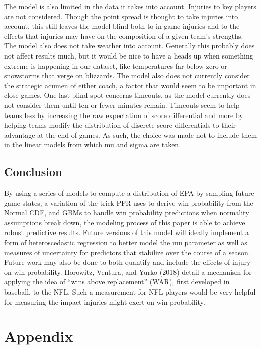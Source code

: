 \documentclass[12pt,twoside]{dukestatscithesis}
\begin{document}
The model is also limited in the data it takes into account. Injuries to key players are not considered. Though the point spread is thought to take injuries into account, this still leaves the model blind both to in-game injuries and to the effects that injuries may have on the composition of a given team's strengths. The model also does not take weather into account. Generally this probably does not affect results much, but it would be nice to have a heads up when something extreme is happening in our dataset, like temperatures far below zero or snowstorms that verge on blizzards. The model also does not currently consider the strategic acumen of either coach, a factor that would seem to be important in close games. One last blind spot concerns timeouts, as the model currently does not consider them until ten or fewer minutes remain. Timeouts seem to help teams less by increasing the raw expectation of score differential and more by helping teams modify the distribution of discrete score differentials to their advantage at the end of games. As such, the choice was made not to include them in the linear models from which mu and sigma are taken.

\hypertarget{conclusion}{%
\section{Conclusion}\label{conclusion}}

By using a series of models to compute a distribution of EPA by sampling future game states, a variation of the trick PFR uses to derive win probability from the Normal CDF, and GBMs to handle win probability predictions when normality assumptions break down, the modeling process of this paper is able to achieve robust predictive results. Future versions of this model will ideally implement a form of heteroscedastic regression to better model the mu parameter as well as measures of uncertainty for predictors that stabilize over the course of a season. Future work may also be done to both quantify and include the effects of injury on win probability. Horowitz, Ventura, and Yurko (2018) detail a mechanism for applying the idea of ``wins above replacement'' (WAR), first developed in baseball, to the NFL. Such a measurement for NFL players would be very helpful for measuring the impact injuries might exert on win probability.

\appendix

\hypertarget{appendix}{%
\chapter{Appendix}\label{appendix}}
\end{document}
